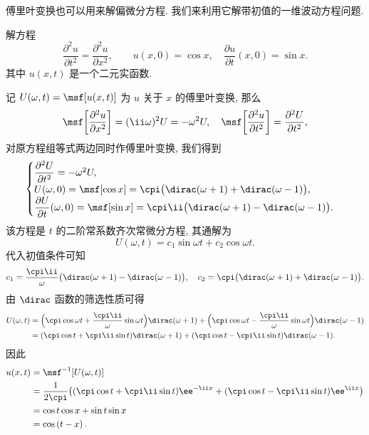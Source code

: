 傅里叶变换也可以用来解偏微分方程.
我们来利用它解带初值的一维波动方程问题.

\begin{example}
  解方程
  \[
     \dfrac{\partial^2 u}{\partial t^2}
    =\dfrac{\partial^2u}{\partial x^2},\qquad
     u(x,0)=\cos x,\quad
     \dfrac{\partial u}{\partial t}(x,0)=\sin x.
  \]
  其中 $u(x,t)$ 是一个二元实函数.
\end{example}

\begin{solution}
  记 $U(\omega,t)=\msf[u(x,t)]$ 为 $u$ 关于 $x$ 的傅里叶变换, 那么
  \[
    \msf\biggl[\frac{\partial^2u}{\partial x^2}\biggr]
   =(\ii\omega)^2 U
   =-\omega^2 U,\quad
    \msf\biggl[\frac{\partial^2u}{\partial t^2}\biggr]
   =\frac{\partial^2 U}{\partial t^2},
  \]
  对原方程组等式两边同时作傅里叶变换, 我们得到
  \[\begin{cases}
     \dfrac{\partial^2 U}{\partial t^2}
    =-\omega^2 U,\\
     U(\omega,0)
    =\msf[\cos x]
    =\cpi\bigl(\dirac(\omega+1)+\dirac(\omega-1)\bigr),\\
     \dfrac{\partial U}{\partial t}(\omega,0)
    =\msf[\sin x]
    =\cpi\ii\bigl(\dirac(\omega+1)-\dirac(\omega-1)\bigr).
  \end{cases}\]
  该方程是 $t$ 的二阶常系数齐次常微分方程, 其通解为
  \[
    U(\omega,t)=c_1\sin\omega t+c_{2}\cos\omega t.
  \]
  代入初值条件可知
  \[
     c_1
    =\frac{\cpi\ii}{\omega}\bigl(\dirac(\omega+1)-\dirac(\omega-1)\bigr),\quad
     c_2
    =\cpi\bigl(\dirac(\omega+1)+\dirac(\omega-1)\bigr).
  \]
  由 $\dirac$ 函数的筛选性质可得
  \begin{align*}
     U(\omega,t)&
    =\Bigl(\cpi\cos\omega t+\frac{\cpi\ii}\omega\sin\omega t\Bigr)\dirac(\omega+1)
    +\Bigl(\cpi\cos\omega t-\frac{\cpi\ii}\omega\sin\omega t\Bigr)\dirac(\omega-1)\\&
    =(\cpi\cos t+\cpi\ii\sin t)\dirac(\omega+1)
    +(\cpi\cos t-\cpi\ii\sin t)\dirac(\omega-1).
  \end{align*}
  因此
  \begin{align*}
     u(x,t)&
    =\msf^{-1}[U(\omega,t)]\\&
    =\frac1{2\cpi}\bigl(
       (\cpi\cos t+\cpi\ii\sin t)\ee^{-\ii x}
      +(\cpi\cos t-\cpi\ii\sin t)\ee^{\ii x}
    \bigr)\\&
    =\cos t\cos x+\sin t\sin x\\&
    =\cos\left(t-x\right).
  \end{align*}
\end{solution}

